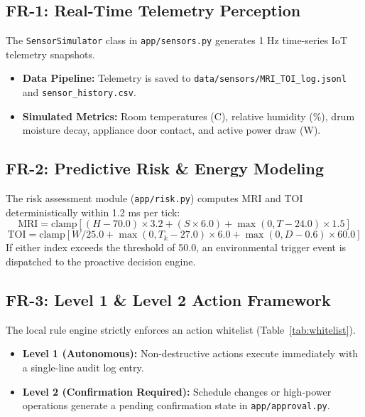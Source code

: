 \documentclass[conference]{IEEEtran}
\begin{document}
\subsection{FR-1: Real-Time Telemetry Perception}
The \texttt{SensorSimulator} class in \texttt{app/sensors.py} generates 1 Hz time-series IoT telemetry snapshots.
\begin{itemize}
    \item \textbf{Data Pipeline:} Telemetry is saved to \texttt{data/sensors/MRI\_TOI\_log.jsonl} and \texttt{sensor\_history.csv}.
    \item \textbf{Simulated Metrics:} Room temperatures (\textdegree C), relative humidity (\%), drum moisture decay, appliance door contact, and active power draw (W).
\end{itemize}

\subsection{FR-2: Predictive Risk \& Energy Modeling}
The risk assessment module (\texttt{app/risk.py}) computes MRI and TOI deterministically within 1.2 ms per tick:
\begin{equation}
\text{MRI} = \text{clamp}[(H - 70.0) \times 3.2 + (S \times 6.0) + \max(0, T - 24.0) \times 1.5]
\end{equation}
\begin{equation}
\text{TOI} = \text{clamp}[W / 25.0 + \max(0, T_k - 27.0) \times 6.0 + \max(0, D - 0.6) \times 60.0]
\end{equation}
If either index exceeds the threshold of 50.0, an environmental trigger event is dispatched to the proactive decision engine.

\subsection{FR-3: Level 1 \& Level 2 Action Framework}
The local rule engine strictly enforces an action whitelist (Table~\ref{tab:whitelist}).
\begin{itemize}
    \item \textbf{Level 1 (Autonomous):} Non-destructive actions execute immediately with a single-line audit log entry.
    \item \textbf{Level 2 (Confirmation Required):} Schedule changes or high-power operations generate a pending confirmation state in \texttt{app/approval.py}.
\end{itemize}
\end{document}
